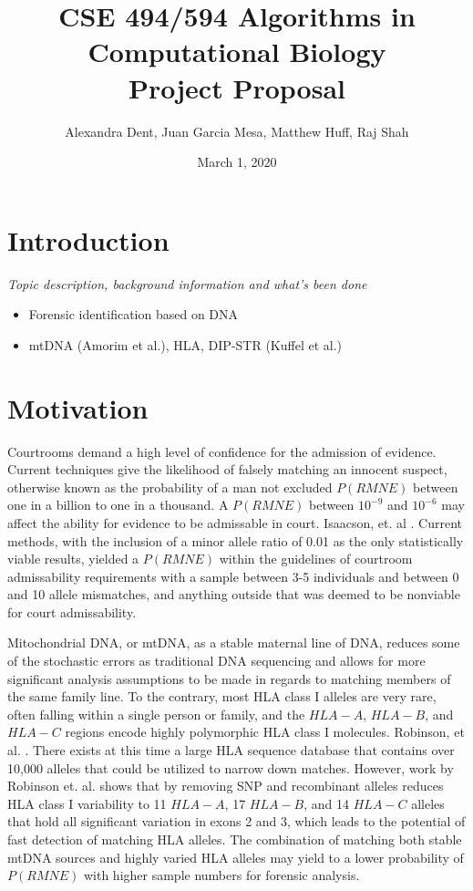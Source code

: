 \documentclass[10pt]{article}
\title{CSE 494/594 Algorithms in Computational Biology \\
		Project Proposal}
\author{Alexandra Dent, Juan Garcia Mesa, Matthew Huff, Raj Shah}
\date{March 1, 2020}
\begin{document}
\maketitle

\section{Introduction}
\textit{Topic description, background information and what's been done}

\begin{itemize}
	\item Forensic identification based on DNA
	\item mtDNA (Amorim et al.), HLA, DIP-STR (Kuffel et al.) 
\end{itemize}

\section{Motivation}
Courtrooms demand a high level of confidence for the admission of evidence. Current techniques give the likelihood of falsely matching an innocent suspect, otherwise known as the probability of a man not excluded $P(RMNE)$ between one in a billion to one in a thousand.  A $P(RMNE)$ between $10^{-9}$ and $10^{-6}$ may affect the ability for evidence to be admissable in court. Isaacson, et. al \cite{Isaacson2014}. Current methods, with the inclusion of a minor allele ratio of 0.01 as the only statistically viable results, yielded a $P(RMNE)$ within the guidelines of courtroom admissability requirements with a sample between 3-5 individuals and between 0 and 10 allele mismatches, and anything outside that was deemed to be nonviable for court admissability.  

Mitochondrial DNA, or mtDNA, as a stable maternal line of DNA, reduces some of the stochastic errors as traditional DNA sequencing and allows for more significant analysis assumptions to be made in regards to matching members of the same family line. To the contrary, most HLA class I alleles are very rare, often falling within a single person or family, and the $HLA-A$, $HLA-B$, and $HLA-C$ regions encode highly polymorphic HLA class I molecules. Robinson, et al. \cite{Robinson2017}.  There exists at this time a large HLA sequence database that contains over 10,000 alleles that could be utilized to narrow down matches.  However, work by Robinson et. al. shows that by removing SNP and recombinant alleles reduces HLA class I variability to 11 $HLA-A$, 17 $HLA-B$, and 14 $HLA-C$ alleles that hold all significant variation in exons 2 and 3, which leads to the potential of fast detection of matching HLA alleles.  The combination of matching both stable mtDNA sources and highly varied HLA alleles may yield to a lower probability of $P(RMNE)$ with higher sample numbers for forensic analysis.
\end{document}
